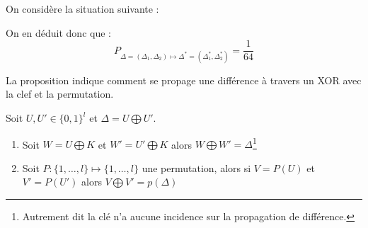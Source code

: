 \documentclass[a4paper, 10pt]{thesis}
\begin{document}
\begin{ex}
    On considère la situation suivante :


    On en déduit donc que : 
    \begin{displaymath}
        P_{\Delta = (\Delta_1, \Delta_2) \mapsto \Delta^* = (\Delta_1^*, \Delta_2^*)} = \frac{1}{64}
    \end{displaymath}
\end{ex}

La proposition indique comment se propage une différence à travers un XOR avec la clef et la
permutation.

\begin{pr}
    Soit $U, U' \in \{0, 1\}^l$ et $\Delta = U \bigoplus U'$.
    \begin{enumerate}
        \item Soit $W = U \bigoplus K$ et $W' = U' \bigoplus K$ alors $W \bigoplus W' =
            \Delta$\footnote{Autrement dit la clé n'a aucune incidence sur la propagation de
            différence.}
        \item Soit $P : \{1, \dots, l\} \mapsto \{1, \dots, l\}$ une permutation, alors si $V =
            P(U)$ et $V' = P(U')$ alors $V \bigoplus V' = p(\Delta)$
    \end{enumerate}
\end{pr}
\end{document}
